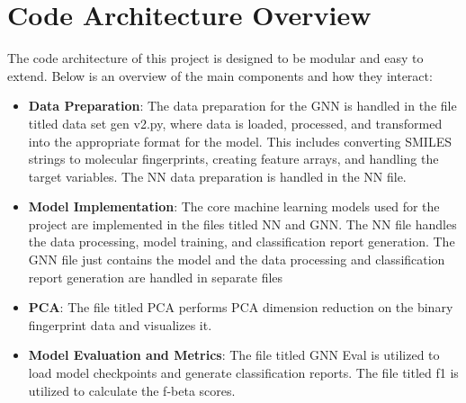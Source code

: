 \documentclass[10pt,twocolumn]{article}
\begin{document}
\section{Code Architecture Overview}

The code architecture of this project is designed to be modular and easy to extend. Below is an overview of the main components and how they interact:

\begin{itemize}
    \item \textbf{Data Preparation}: 
    The data preparation for the GNN is handled in the file titled data set gen v2.py, where data is loaded, processed, and transformed into the appropriate format for the model. This includes converting SMILES strings to molecular fingerprints, creating feature arrays, and handling the target variables. The NN data preparation is handled in the NN file. 
    
    \item \textbf{Model Implementation}: 
    The core machine learning models used for the project are implemented in the files titled NN and GNN. The NN file handles the data processing, model training, and classification report generation. The GNN file just contains the model and the data processing and classification report generation are handled in separate files

    \item \textbf{PCA}: 
    The file titled PCA performs PCA dimension reduction on the binary fingerprint data and visualizes it. 

    \item \textbf{Model Evaluation and Metrics}: 
    The file titled GNN Eval is utilized to load model checkpoints and generate classification reports. The file titled f1 is utilized to calculate the f-beta scores. 

\end{itemize}



\printbibliography
\end{document}
